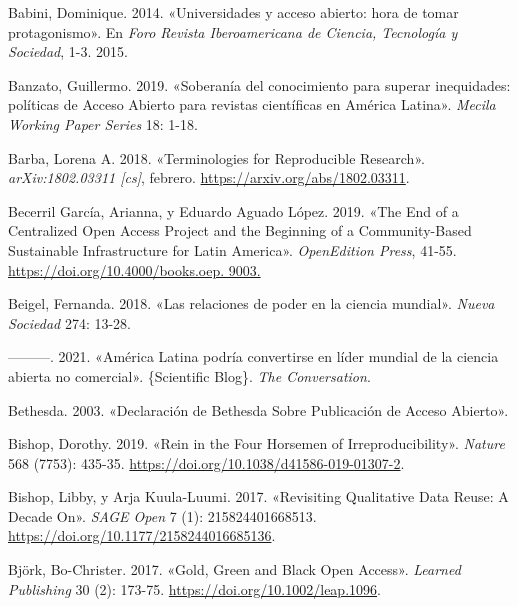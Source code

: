 \documentclass[
  spanish,
  letterpaper,
  DIV=11,
  numbers=noendperiod]{scrreprt}
\newlength{\cslhangindent}
\newenvironment{CSLReferences}[2] %
 {\begin{list}{}{%
  \setlength{\itemindent}{0pt}
  \setlength{\leftmargin}{0pt}
  \setlength{\parsep}{0pt}
  \ifodd #1
   \setlength{\leftmargin}{\cslhangindent}
   \setlength{\itemindent}{-1\cslhangindent}
  \fi
  \setlength{\itemsep}{#2\baselineskip}}}
 {\end{list}}
\begin{document}
\begin{CSLReferences}{1}{0}
Babini, Dominique. 2014. {«{Universidades y acceso abierto: hora de
tomar protagonismo}»}. En \emph{{Foro Revista Iberoamericana de Ciencia,
Tecnolog{í}a y Sociedad}}, 1-3. 2015.

Banzato, Guillermo. 2019. {«{Soberan{í}a del conocimiento para superar
inequidades: pol{í}ticas de Acceso Abierto para revistas cient{í}ficas
en Am{é}rica Latina}»}. \emph{Mecila Working Paper Series} 18: 1-18.

Barba, Lorena A. 2018. {«Terminologies for {Reproducible Research}»}.
\emph{arXiv:1802.03311 {[}cs{]}}, febrero.
\url{https://arxiv.org/abs/1802.03311}.

Becerril García, Arianna, y Eduardo Aguado López. 2019. {«The {End} of a
{Centralized Open Access Project} and the {Beginning} of a
{Community-Based Sustainable Infrastructure} for {Latin America}»}.
\emph{OpenEdition Press}, 41-55.
\href{https://doi.org/10.4000/books.oep.\%209003.}{https://doi.org/10.4000/books.oep.
9003.}

Beigel, Fernanda. 2018. {«{Las relaciones de poder en la ciencia
mundial}»}. \emph{Nueva Sociedad} 274: 13-28.

---------. 2021. {«{Am{é}rica Latina podr{í}a convertirse en l{í}der
mundial de la ciencia abierta no comercial}»}. \{Scientific Blog\}.
\emph{The Conversation}.

Bethesda. 2003. {«Declaraci{ó}n de {Bethesda} Sobre Publicaci{ó}n de
Acceso Abierto»}.

Bishop, Dorothy. 2019. {«Rein in the Four Horsemen of
Irreproducibility»}. \emph{Nature} 568 (7753): 435-35.
\url{https://doi.org/10.1038/d41586-019-01307-2}.

Bishop, Libby, y Arja Kuula-Luumi. 2017. {«Revisiting {Qualitative Data
Reuse}: {A Decade On}»}. \emph{SAGE Open} 7 (1): 215824401668513.
\url{https://doi.org/10.1177/2158244016685136}.

Björk, Bo-Christer. 2017. {«Gold, {Green} and {Black Open Access}»}.
\emph{Learned Publishing} 30 (2): 173-75.
\url{https://doi.org/10.1002/leap.1096}.


\end{CSLReferences}
\end{document}

